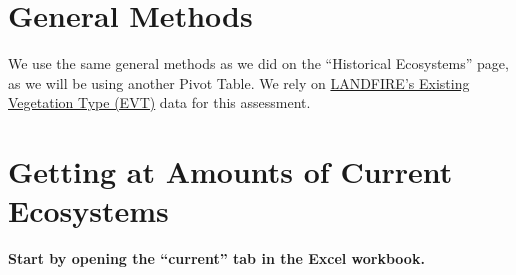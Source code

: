 \documentclass[
]{book}
\begin{document}
\hypertarget{general-methods-1}{%
\section{General Methods}\label{general-methods-1}}

We use the same general methods as we did on the ``Historical Ecosystems'' page, as we will be using another Pivot Table. We rely on \href{https://www.landfire.gov/evt.php}{LANDFIRE's Existing Vegetation Type (EVT)} data for this assessment.

\hypertarget{getting-at-amounts-of-current-ecosystems}{%
\section{Getting at Amounts of Current Ecosystems}\label{getting-at-amounts-of-current-ecosystems}}

\textbf{Start by opening the ``current'' tab in the Excel workbook.}
\end{document}
